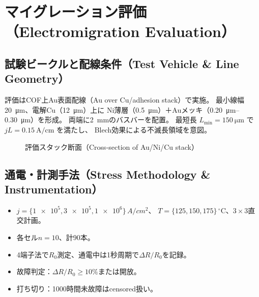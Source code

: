 \documentclass[onecolumn]{IEEEtran} %
\begin{document}
\section{マイグレーション評価（Electromigration Evaluation）}

\subsection{試験ビークルと配線条件（Test Vehicle \& Line Geometry）}
評価はCOF上Au表面配線（Au over Cu/adhesion stack）で実施。
最小線幅 \SI{20}{\micro\meter}、電解Cu（\SI{12}{\micro\meter}）上に
Ni薄層（\SI{0.5}{\micro\meter}）＋Auメッキ（\SIrange{0.20}{0.30}{\micro\meter}）を形成。
両端に\SI{2}{\milli\meter}のバスバーを配置。
最短長 $L_{\min}=\SI{150}{\micro\meter}$ で $jL=\SI{0.15}{\ampere\per\centi\meter}$ を満たし、
Blech効果による不滅長領域を意図。

\begin{figure}[htbp]
  \centering
  \caption{評価スタック断面（Cross-section of Au/Ni/Cu stack）}
  \label{fig:em-stack}
\end{figure}

\subsection{通電・計測手法（Stress Methodology \& Instrumentation）}
\begin{itemize}
  \item $j=\{ \SI{1e5}, \SI{3e5}, \SI{1e6}\}\,\si{A/cm^2}$、
        $T=\{ \SI{125}, \SI{150}, \SI{175}\}\,^\circ$C、$3\times 3$直交計画。
  \item 各セル$n=10$、計90本。
  \item 4端子法で$R_0$測定、通電中は1秒周期で$\Delta R/R_0$を記録。
  \item 故障判定：$\Delta R/R_0 \ge 10\%$または開放。
  \item 打ち切り：1000時間未故障はcensored扱い。
\end{itemize}
\end{document}
